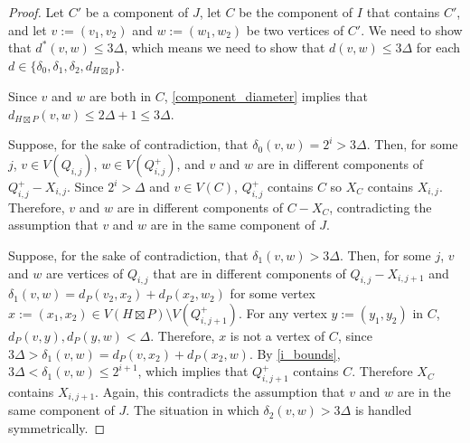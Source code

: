 \documentclass{patmorin}
\renewcommand{\le}{\leqslant}
\begin{document}
\begin{proof}
  Let $C'$ be a component of $J$, let $C$ be the component of $I$ that contains $C'$, and let $v:=(v_1,v_2)$ and $w:=(w_1,w_2)$ be two vertices of $C'$. We need to show that $d^*(v,w)\le 3\Delta$, which means we need to show that $d(v,w)\le 3\Delta$ for each $d\in\{\delta_0, \delta_1,\delta_2,d_{H\boxtimes p}\}$.

  Since $v$ and $w$ are both in $C$, \cref{component_diameter} implies that $d_{H\boxtimes P}(v,w)\le 2\Delta+1 \le 3\Delta$.

  Suppose, for the sake of contradiction, that $\delta_0(v,w)=2^i> 3\Delta$. Then, for some $j$, $v\in V(Q_{i,j})$,  $w\in V(Q^+_{i,j})$, and $v$ and $w$ are in different components of $Q^+_{i,j}-X_{i,j}$.  Since $2^i>\Delta$ and $v\in V(C)$, $Q^+_{i,j}$ contains $C$ so $X_C$ contains $X_{i,j}$. Therefore, $v$ and $w$ are in different components of $C-X_C$, contradicting the assumption that $v$ and $w$ are in the same component of $J$.

  Suppose, for the sake of contradiction, that $\delta_1(v,w)>3\Delta$.  Then, for some $j$, $v$ and $w$ are vertices of $Q_{i,j}$ that are in different components of $Q_{i,j}-X_{i,j+1}$ and $\delta_1(v,w)=d_P(v_2,x_2)+d_P(x_2,w_2)$ for some vertex $x:=(x_1,x_2)\in V(H\boxtimes P)\setminus V(Q^+_{i,j+1})$.  For any vertex $y:=(y_1,y_2)$ in $C$, $d_P(v,y),d_P(y,w) <\Delta$.  Therefore, $x$ is not a vertex of $C$, since
  $3\Delta>\delta_1(v,w)=d_P(v,x_2)+d_P(x_2,w)$.  By \cref{i_bounds}, $3\Delta<\delta_1(v,w)\le 2^{i+1}$, which implies that $Q^+_{i,j+1}$ contains $C$.  Therefore $X_C$ contains $X_{i,j+1}$.  Again, this contradicts the assumption that $v$ and $w$ are in the same component of $J$.  The situation in which $\delta_2(v,w)>3\Delta$ is handled symmetrically.
\end{proof}
\end{document}
